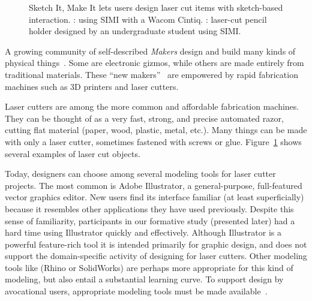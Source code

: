 \documentclass{article}
\begin{document}
\begin{figure}[b]
\centering 
{}
\caption{Sketch It, Make It lets users design laser cut items with
  sketch-based interaction. : using SIMI with a
  Wacom Cintiq. : laser-cut pencil
  holder designed by an undergraduate student using SIMI.}
\label{fig:laser-example}
\end{figure}

A growing community of self-described \textit{Makers} design and build
many kinds of physical things~\cite{gershenfeld-fab}. Some are
electronic gizmos, while others are made entirely from traditional
materials. These ``new makers''~\cite{gross-new-makers} are empowered
by rapid fabrication machines such as 3D printers and laser cutters.

Laser cutters are among the more common and affordable fabrication
machines. They can be thought of as a very fast, strong, and precise
automated razor, cutting flat material (paper, wood, plastic, metal,
etc.). Many things can be made with only a laser cutter, sometimes
fastened with screws or glue.  Figure~\ref{fig:laser-example} shows
several examples of laser cut objects.


Today, designers can choose among several modeling tools for laser
cutter projects. The most common is Adobe Illustrator, a
general-purpose, full-featured vector graphics editor. New users find
its interface familiar (at least superficially) because it resembles
other applications they have used previously. Despite this sense of
familiarity, participants in our formative study (presented later) had
a hard time using Illustrator quickly and effectively. Although
Illustrator is a powerful feature-rich tool it is intended primarily
for graphic design, and does not support the domain-specific activity
of designing for laser cutters. Other modeling tools like (Rhino or
SolidWorks) are perhaps more appropriate for this kind of modeling,
but also entail a substantial learning curve. To support design by
avocational users, appropriate modeling tools must be made
available~\cite{lipson-homefactory}.
\end{document}
